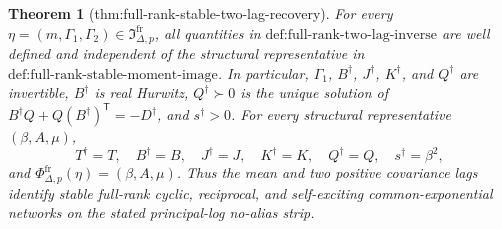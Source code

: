 \documentclass{article}
\newtheorem{theorem}{Theorem}
\begin{document}
\begin{theorem}[thm:full-rank-stable-two-lag-recovery]\label{thm:full-rank-stable-two-lag-recovery}
For every \(\eta=(m,\Gamma_1,\Gamma_2)\in\mathfrak I_{\Delta,p}^{\mathrm{fr}}\), all quantities in \(\text{def:full-rank-two-lag-inverse}\) are well defined and independent of the structural representative in \(\text{def:full-rank-stable-moment-image}\). In particular, \(\Gamma_1\), \(B^\dagger\), \(J^\dagger\), \(K^\dagger\), and \(Q^\dagger\) are invertible, \(B^\dagger\) is real Hurwitz, \(Q^\dagger\succ0\) is the unique solution of \(B^\dagger Q+Q(B^\dagger)^{\mathsf T}=-D^\dagger\), and \(s^\dagger>0\). For every structural representative \((\beta,A,\mu)\),
\[
 T^\dagger=T,\quad B^\dagger=B,\quad J^\dagger=J,\quad K^\dagger=K,\quad Q^\dagger=Q,\quad s^\dagger=\beta^2,
\]
and \(\Phi^{\mathrm{fr}}_{\Delta,p}(\eta)=(\beta,A,\mu)\). Thus the mean and two positive covariance lags identify stable full-rank cyclic, reciprocal, and self-exciting common-exponential networks on the stated principal-log no-alias strip.
\end{theorem}
\end{document}
